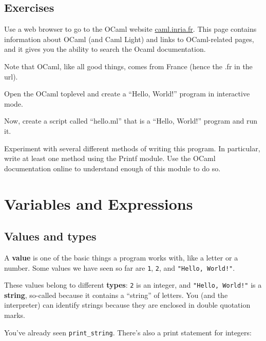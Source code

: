 \documentclass[10pt]{book}
\begin{document}
\section{Exercises}

\begin{ex}
Use a web browser to go to the OCaml website \url{caml.inria.fr}. This page contains information about OCaml (and Caml Light) and links to OCaml-related pages, and it gives you the ability to search the Ocaml documentation.

Note that OCaml, like all good things, comes from France (hence the .fr in the url).

\end{ex}

\begin{ex}
Open the OCaml toplevel and create a ``Hello, World!'' program in interactive mode.

Now, create a script called ``hello.ml'' that is a ``Hello, World!'' program and run it.

Experiment with several different methods of writing this program. In particular, write at least one method using the Printf module. Use the OCaml documentation online to understand enough of this module to do so.
\end{ex}


\chapter{Variables and Expressions}

\section{Values and types}

A {\bf value} is one of the basic things a program works with, like a letter or a number.  Some values we have seen so far are {\tt 1}, {\tt 2}, and {\tt "Hello, World!"}.

These values belong to different {\bf types}: {\tt 2} is an integer, and {\tt "Hello, World!"} is a {\bf string}, so-called because it contains a ``string'' of letters. You (and the interpreter) can identify strings because they are enclosed in double quotation marks.


You've already seen \verb"print_string". There's also a print statement for integers:
\end{document}
